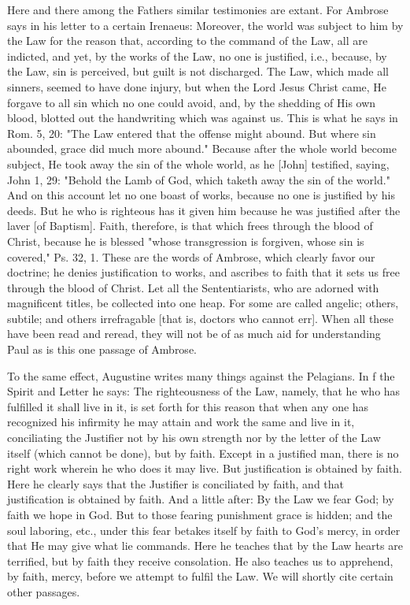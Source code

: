 Here and there among the Fathers similar testimonies are extant.  For
Ambrose says in his letter to a certain Irenaeus: Moreover, the world
was subject to him by the Law for the reason that, according to the
command of the Law, all are indicted, and yet, by the works of the
Law, no one is justified, i.e., because, by the Law, sin is perceived,
but guilt is not discharged.  The Law, which made all sinners,
seemed to have done injury, but when the Lord Jesus Christ came, He
forgave to all sin which no one could avoid, and, by the shedding of
His own blood, blotted out the handwriting which was against us.
This is what he says in Rom. 5, 20: "The Law entered that the offense
might abound.  But where sin abounded, grace did much more abound."
Because after the whole world become subject, He took away the sin of
the whole world, as he [John] testified, saying, John 1, 29: "Behold
the Lamb of God, which taketh away the sin of the world." And on this
account let no one boast of works, because no one is justified by his
deeds.  But he who is righteous has it given him because he was
justified after the laver [of Baptism].  Faith, therefore, is that
which frees through the blood of Christ, because he is blessed "whose
transgression is forgiven, whose sin is covered," Ps. 32, 1. These
are the words of Ambrose, which clearly favor our doctrine; he denies
justification to works, and ascribes to faith that it sets us free
through the blood of Christ.  Let all the Sententiarists, who are
adorned with magnificent titles, be collected into one heap.  For
some are called angelic; others, subtile; and others irrefragable
[that is, doctors who cannot err].  When all these have been read and
reread, they will not be of as much aid for understanding Paul as is
this one passage of Ambrose.

To the same effect, Augustine writes many things against the
Pelagians.  In f the Spirit and Letter he says: The righteousness of
the Law, namely, that he who has fulfilled it shall live in it, is
set forth for this reason that when any one has recognized his
infirmity he may attain and work the same and live in it,
conciliating the Justifier not by his own strength nor by the letter
of the Law itself (which cannot be done), but by faith.  Except in a
justified man, there is no right work wherein he who does it may live.
But justification is obtained by faith.  Here he clearly says that
the Justifier is conciliated by faith, and that justification is
obtained by faith.  And a little after: By the Law we fear God; by
faith we hope in God.  But to those fearing punishment grace is
hidden; and the soul laboring, etc., under this fear betakes itself
by faith to God's mercy, in order that He may give what lie commands.
Here he teaches that by the Law hearts are terrified, but by faith
they receive consolation.  He also teaches us to apprehend, by faith,
mercy, before we attempt to fulfil the Law.  We will shortly cite
certain other passages.

